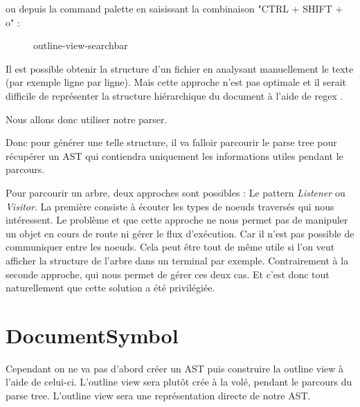 \documentclass[
    iict, %
    il, %
]{heig-tb}
\begin{document}
ou depuis la command palette en saisissant la combinaison "CTRL + SHIFT + o" :

\begin{figure}[!h]
    \begin{center}
    \end{center}
    \caption[Outline view disponible depuis la searchbar]{\label{outline-view-searchbar} outline-view-searchbar}
\end{figure}

Il est possible obtenir la structure d'un fichier en analysant manuellement le texte (par exemple ligne par ligne).
Mais cette approche n'est pas optimale et il serait difficile de représenter la structure hiérarchique du document à l'aide de regex \cite{antlr-mega-tutorial}.

Nous allons donc utiliser notre parser.

Donc pour générer une telle structure, il va falloir parcourir le parse tree pour récupérer un AST qui contiendra uniquement les informations utiles pendant le parcours.

Pour parcourir un arbre, deux approches sont possibles : Le pattern \emph{Listener} ou \emph{Visitor}.
La première consiste à écouter les types de noeuds traversés qui nous intéressent. Le problème et que cette approche ne nous permet pas de manipuler un objet en cours de route ni gérer le flux d'exécution.
Car il n'est pas possible de communiquer entre les noeuds. Cela peut être tout de même utile si l'on veut afficher la structure de l'arbre dans un terminal par exemple.
Contrairement à la seconde approche, qui nous permet de gérer ces deux cas. Et c'est donc tout naturellement que cette solution a été privilégiée.

\section{DocumentSymbol}

Cependant on ne va pas d'abord créer un AST puis construire la outline view à l'aide de celui-ci.
L'outline view sera plutôt crée à la volé, pendant le parcours du parse tree. L'outline view sera une représentation directe de notre AST.
\end{document}
